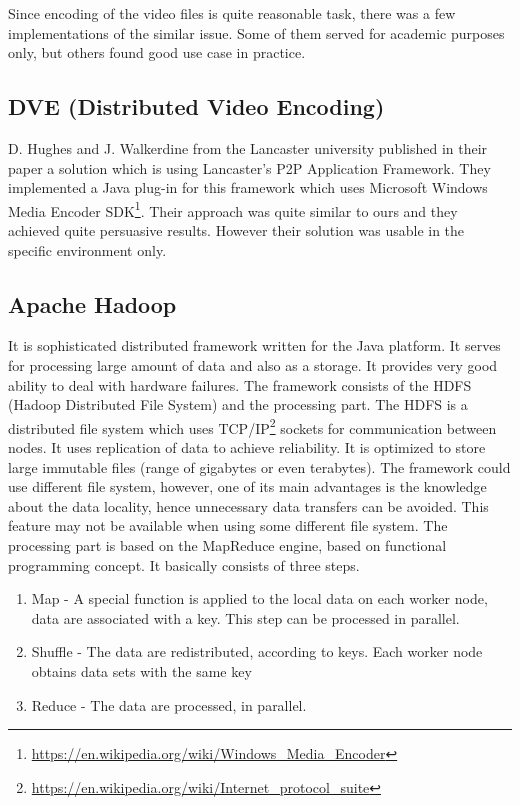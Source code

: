 Since encoding of the video files is quite reasonable task, there was a
few implementations of the similar issue. Some of them served for
academic purposes only, but others found good use case in practice.

\subsection{DVE (Distributed Video
Encoding)}\label{dve-distributed-video-encoding}

D. Hughes and J. Walkerdine from the Lancaster university published in
their paper a solution which is using Lancaster's P2P Application
Framework. They implemented a Java plug-in for this framework which uses
Microsoft Windows Media Encoder
SDK\footnote{\url{https://en.wikipedia.org/wiki/Windows\_Media\_Encoder}}.
Their approach was quite similar to ours and they achieved quite
persuasive results. However their solution was usable in the specific
environment only.\citep{DVE}

\subsection{Apache Hadoop}\label{apache-hadoop}

It is sophisticated distributed framework written for the Java platform.
It serves for processing large amount of data and also as a storage. It
provides very good ability to deal with hardware failures. The framework
consists of the HDFS (Hadoop Distributed File System) and the processing
part. The HDFS is a distributed file system which uses
TCP/IP\footnote{\url{https://en.wikipedia.org/wiki/Internet\_protocol\_suite}}
sockets for communication between nodes. It uses replication of data to
achieve reliability. It is optimized to store large immutable files
(range of gigabytes or even terabytes). The framework could use
different file system, however, one of its main advantages is the
knowledge about the data locality, hence unnecessary data transfers can
be avoided. This feature may not be available when using some different
file system. The processing part is based on the MapReduce engine, based
on functional programming concept. It basically consists of three steps.

\begin{enumerate}
\item Map - A special function is applied to the local data on each worker node, data are associated with a key. This step can be processed in parallel.
\item Shuffle - The data are redistributed, according to keys. Each worker node obtains data sets with the same key
\item Reduce - The data are processed, in parallel.
\end{enumerate}

